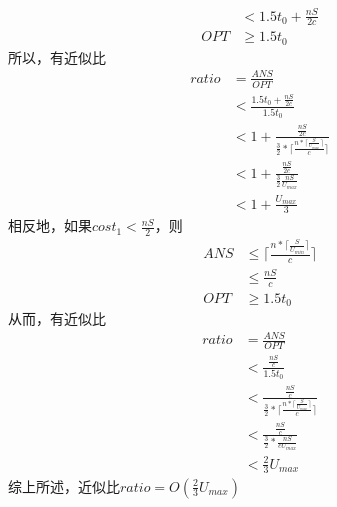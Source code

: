\documentclass[UTF8]{ctexart}
\begin{document}
\begin{enumerate}[I]
\begin{enumerate}[(a)]
\begin{align*}
				&< 1.5t_{0} + \frac{nS}{2c} \\
			OPT &\ge 1.5t_{0}
		\end{align*}
		所以，有近似比
		\begin{align*}
			ratio &= \frac{ANS}{OPT} \\
				  &< \frac{1.5t_{0} + \frac{nS}{2c}}{1.5t_{0}} \\
				  &< 1 + \frac{\frac{nS}{2c}}{{\frac{3}{2} * \lceil \frac{n * \lceil \frac{S}{U_{max}} \rceil}{c} \rceil}}  \\
				  &< 1 + \frac{\frac{nS}{2c}}{{\frac{3}{2} \frac{nS}{U_{max}}}} \\
				  &< 1 + \frac{U_{max}}{3}
		\end{align*}
		相反地，如果$cost_{1} < \frac{nS}{2}$，则
		\begin{align*}
			ANS &\le \lceil \frac{n * \lceil \frac{S}{U_{min}} \rceil }{c} \rceil \\
				&\le \frac{nS}{c} \\
			OPT &\ge 1.5t_{0}
		\end{align*}
		从而，有近似比
		\begin{align*}
			ratio &= \frac{ANS}{OPT} \\
				  &< \frac{\frac{nS}{c}}{1.5t_{0}} \\
				  &< \frac{\frac{nS}{c}}{\frac{3}{2} * \lceil \frac{n * \lceil \frac{S}{U_{max}} \rceil}{c} \rceil} \\
				  &< \frac{\frac{nS}{c}}{\frac{3}{2} * \frac{nS}{cU_{max}}} \\
				  &< \frac{2}{3}U_{max}
		\end{align*}
		综上所述，近似比$ratio = O(\frac{2}{3} U_{max})$
		
	\end{enumerate}


\end{enumerate}
\end{document}
